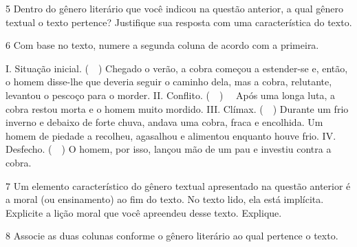 
\num{5} Dentro do gênero literário que você indicou na questão anterior,
a qual gênero textual o texto pertence? Justifique sua resposta com uma
característica do texto.


\num{6} Com base no texto, numere a segunda coluna de acordo com a
primeira.

I. Situação inicial. (~~) Chegado o verão, a cobra começou a
estender-se e, então, o homem disse-lhe que deveria seguir o caminho
dela, mas a cobra, relutante, levantou o pescoço para o morder. II.
Conflito. (~~) ~~Após uma longa luta, a cobra restou morta e
o homem muito mordido. III. Clímax. (~~) Durante um frio
inverno e debaixo de forte chuva, andava uma cobra, fraca e encolhida.
Um homem de piedade a recolheu, agasalhou e alimentou enquanto houve
frio. IV. Desfecho. (~~) O homem, por isso, lançou mão de um
pau e investiu contra a cobra.

\num{7} Um elemento característico do gênero textual apresentado na
questão anterior é a moral (ou ensinamento) ao fim do texto. No texto
lido, ela está implícita. Explicite a lição moral que você apreendeu
desse texto. Explique.



\num{8} Associe as duas colunas conforme o gênero literário ao qual
pertence o texto.


